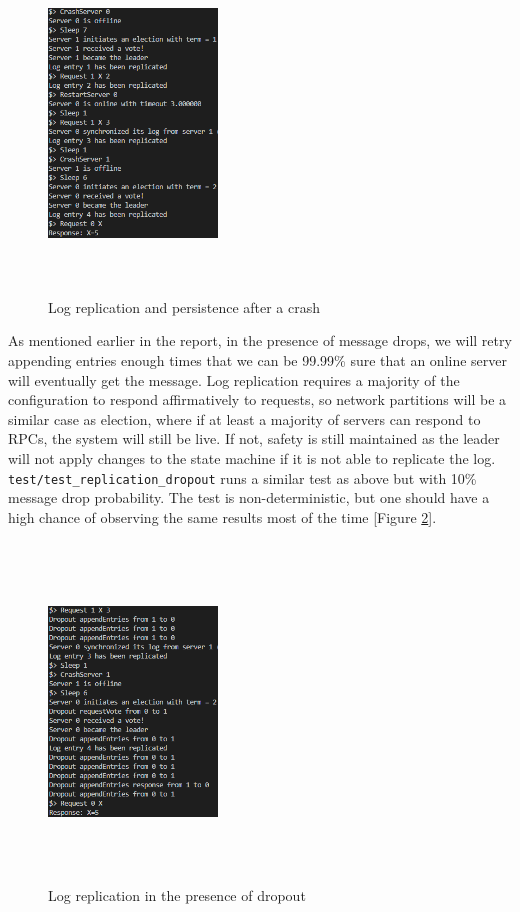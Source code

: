 \documentclass[letterpaper,twocolumn,10pt]{article}
\begin{document}
\begin{figure}[htb!]
\centering
\includegraphics[width=0.40\textwidth,height=90mm]{images/log_replication.png}
\caption{Log replication and persistence after a crash}
\label{fig:log_replication}
\end{figure}

As mentioned earlier in the report, in the presence of message drops, we will retry appending entries enough times that we can be 99.99\% sure that an online server will eventually get the message. Log replication requires a majority of the configuration to respond affirmatively to requests, so network partitions will be a similar case as election, where if at least a majority of servers can respond to RPCs, the system will still be live. If not, safety is still maintained as the leader will not apply changes to the state machine if it is not able to replicate the log. \texttt{test/test\_replication\_dropout} runs a similar test as above but with 10\% message drop probability. The test is non-deterministic, but one should have a high chance of observing the same results most of the time [Figure \ref{fig:log_dropout}].

\begin{figure}[htb!]
\centering
\includegraphics[width=0.40\textwidth,height=90mm]{images/log_dropout.png}
\caption{Log replication in the presence of dropout}
\label{fig:log_dropout}
\end{figure}
\end{document}
